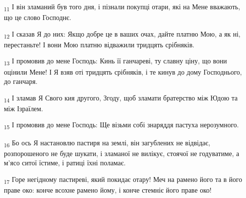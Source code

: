 \begin{tcolorbox}
\textsubscript{11} І він зламаний був того дня, і пізнали покупці отари, які на Мене вважають, що це слово Господнє.
\end{tcolorbox}
\begin{tcolorbox}
\textsubscript{12} І сказав Я до них: Якщо добре це в ваших очах, дайте платню Мою, а як ні, перестаньте! І вони Мою платню відважили тридцять срібняків.
\end{tcolorbox}
\begin{tcolorbox}
\textsubscript{13} І промовив до мене Господь: Кинь її ганчареві, ту славну ціну, що вони оцінили Мене! І Я взяв оті тридцять срібняків, і те кинув до дому Господнього, до ганчаря.
\end{tcolorbox}
\begin{tcolorbox}
\textsubscript{14} І зламав Я Свого кия другого, Згоду, щоб зламати братерство між Юдою та між Ізраїлем.
\end{tcolorbox}
\begin{tcolorbox}
\textsubscript{15} І промовив до мене Господь: Ще візьми собі знаряддя пастуха нерозумного.
\end{tcolorbox}
\begin{tcolorbox}
\textsubscript{16} Бо ось Я настановлю пастиря на землі, він загублених не відвідає, розпорошеного не буде шукати, і зламаної не вилікує, стоячої не годуватиме, а м'ясо ситої їстиме, і ратиці їхні поламає.
\end{tcolorbox}
\begin{tcolorbox}
\textsubscript{17} Горе негідному пастиреві, який покидає отару! Меч на рамено його та в його праве око: конче всохне рамено йому, і конче стемніє його праве око!
\end{tcolorbox}
